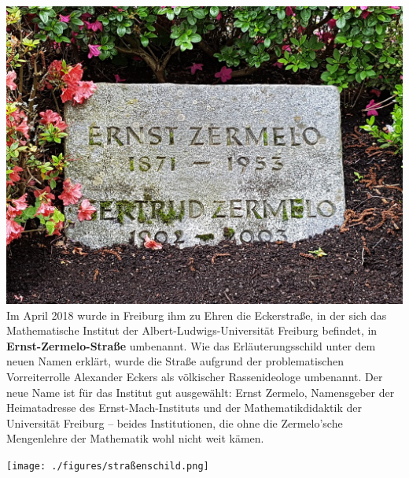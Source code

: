\documentclass[landscape, a4paper]{article}
\newcommand\alert[1]{\textcolor{PrimaryColor}{\textbf{#1}}}
\begin{document}
\begin{minipage}[t]{0.33\textwidth}
	\vspace{0cm}
	\setlength{\parskip}{0.25cm}

	\includegraphics[width=\linewidth]{./figures/grabstein.png}
	\setlength{\parskip}{0.25cm}
	\vspace{0.15cm}
	Im April 2018 wurde in Freiburg ihm zu Ehren die Eckerstraße, in der sich das Mathematische Institut der Albert-Ludwigs-Universität Freiburg befindet, in \alert{Ernst-Zermelo-Straße} umbenannt. Wie das Erläuterungsschild unter dem neuen Namen erklärt, wurde die Straße aufgrund der problematischen Vorreiterrolle Alexander Eckers als völkischer Rassenideologe umbenannt. Der neue Name ist für das Institut gut ausgewählt: Ernst Zermelo, Namensgeber der Heimatadresse des Ernst-Mach-Instituts und der Mathematikdidaktik der Universität Freiburg – beides Institutionen, die ohne die Zermelo’sche Mengenlehre der Mathematik wohl nicht weit kämen. %

	\texttt{[image: ./figures/straßenschild.png]}
	\setlength{\parskip}{0.25cm}
	\vspace{0.15cm}
\end{minipage}
\end{document}

